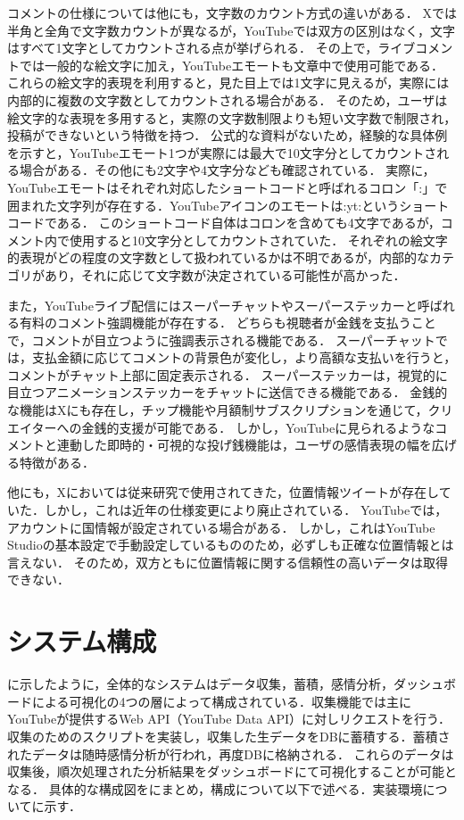   コメントの仕様については他にも，文字数のカウント方式の違いがある．
  Xでは半角と全角で文字数カウントが異なるが，YouTubeでは双方の区別はなく，文字はすべて1文字としてカウントされる点が挙げられる．
  その上で，ライブコメントでは一般的な絵文字に加え，YouTubeエモートも文章中で使用可能である．
  これらの絵文字的表現を利用すると，見た目上では1文字に見えるが，実際には内部的に複数の文字数としてカウントされる場合がある．
  そのため，ユーザは絵文字的な表現を多用すると，実際の文字数制限よりも短い文字数で制限され，投稿ができないという特徴を持つ．
  公式的な資料がないため，経験的な具体例を示すと，YouTubeエモート1つが実際には最大で10文字分としてカウントされる場合がある．その他にも2文字や4文字分なども確認されている．
  実際に，YouTubeエモートはそれぞれ対応したショートコードと呼ばれるコロン「:」で囲まれた文字列が存在する．YouTubeアイコンのエモートは:yt:というショートコードである．
  このショートコード自体はコロンを含めても4文字であるが，コメント内で使用すると10文字分としてカウントされていた．
  それぞれの絵文字的表現がどの程度の文字数として扱われているかは不明であるが，内部的なカテゴリがあり，それに応じて文字数が決定されている可能性が高かった．

  また，YouTubeライブ配信にはスーパーチャットやスーパーステッカーと呼ばれる有料のコメント強調機能が存在する．
  どちらも視聴者が金銭を支払うことで，コメントが目立つように強調表示される機能である．
  スーパーチャットでは，支払金額に応じてコメントの背景色が変化し，より高額な支払いを行うと，コメントがチャット上部に固定表示される．
  スーパーステッカーは，視覚的に目立つアニメーションステッカーをチャットに送信できる機能である．
  金銭的な機能はXにも存在し，チップ機能や月額制サブスクリプションを通じて，クリエイターへの金銭的支援が可能である．
  しかし，YouTubeに見られるようなコメントと連動した即時的・可視的な投げ銭機能は，ユーザの感情表現の幅を広げる特徴がある．

  他にも，Xにおいては従来研究で使用されてきた，位置情報ツイートが存在していた．しかし，これは近年の仕様変更により廃止されている．
  YouTubeでは，アカウントに国情報が設定されている場合がある．
  しかし，これはYouTube Studioの基本設定で手動設定しているもののため，必ずしも正確な位置情報とは言えない．
  そのため，双方ともに位置情報に関する信頼性の高いデータは取得できない．

  \section{システム構成}

  に示したように，全体的なシステムはデータ収集，蓄積，感情分析，ダッシュボードによる可視化の4つの層によって構成されている．収集機能では主にYouTubeが提供するWeb
  API（YouTube Data API）に対しリクエストを行う．収集のためのスクリプトを実装し，収集した生データをDBに蓄積する．蓄積されたデータは随時感情分析が行われ，再度DBに格納される．
  これらのデータは収集後，順次処理された分析結果をダッシュボードにて可視化することが可能となる． 具体的な構成図をにまとめ，構成について以下で述べる．実装環境についてに示す．

